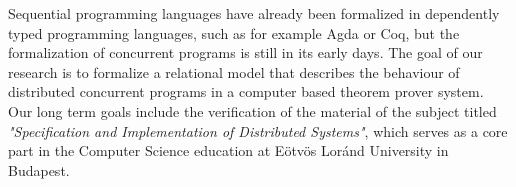 Sequential programming languages have already been formalized in dependently typed programming languages, such as for example Agda or Coq, but the formalization of concurrent programs is still in its early days. The goal of our research is to formalize a relational model that describes the behaviour of distributed concurrent programs in a computer based theorem prover system. Our long term goals include the verification of the material of the subject titled \textit{"Specification and Implementation of Distributed Systems"}, which serves as a core part in the Computer Science education at Eötvös Loránd University in Budapest.